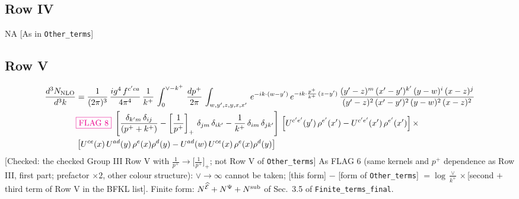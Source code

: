 \documentclass[9pt]{article}
\numberwithin{equation}{section}
\begin{document}
\subsection{Row IV}
\textsc{NA} {\color{red}[As in \texttt{Other\_terms}]}
\subsection{Row V}
\begin{align}
    \frac{d^{3}N_{\rm NLO}}{d^{3}k} & = \frac{1}{(2\pi)^{3}}\, \frac{ig^{4}\,f^{c'ca}}{4\pi^{4}}\, \frac{1}{k^{+}}\,\int_{0}^{\vee-k^{+}}\, \frac{dp^{+}}{2\pi}\, \int_{w,y',z,y,x,x'}\, e^{-ik\cdot (w-y')}\, e^{-ik\cdot \frac{p^{+}}{k^{+}}\,(z-y')}\, \frac{(y'-z)^{m}\,(x'-y')^{k'}\,(y-w)^{i}\,(x-z)^{j}}{(y'-z)^{2}\,(x'-y')^{2}\,(y-w)^{2}\,(x-z)^{2}}\notag \\ & {\color{magenta}\fbox{FLAG 8}}\;\left[\frac{\delta_{k'm}\,\delta_{ij}}{(p^{+}+k^{+})}-\left[\frac{1}{p^{+}}\right]_{+}\,\delta_{jm}\,\delta_{ik'}-\frac{1}{k^{+}}\, \delta_{im}\, \delta_{jk'}\right]\, \left[U^{c'e'}(y')\,\rho^{e'}(x')-U^{c'e'}(x')\,\rho^{e'}(x')\right]\times \notag \\ &  \left[U^{ce}(x)\,U^{ad}(y)\,\rho^{e}(x)\rho^{d}(y)-U^{ad}(w)\,U^{ce}(x)\,\rho^{e}(x)\rho^{d}(y)\right]
\end{align} {\color{red}[Checked: the checked Group III Row V with $\frac{1}{p^{+}}\to\big[\frac{1}{p^{+}}\big]_{+}$; not Row V of \texttt{Other\_terms}]} {\color{magenta} As FLAG 6 (same kernels and $p^{+}$ dependence as Row III, first part; prefactor $\times2$, other colour structure): $\vee\to\infty$ cannot be taken; [this form] $-$ [form of \texttt{Other\_terms}] $=\log\frac{\vee}{k^{+}}\times$[second $+$ third term of Row V in the BFKL list]. Finite form: $N^{\widehat{\mathcal{E}}}+N^{\Psi}+N^{\rm sub}$ of Sec.~3.5 of \texttt{Finite\_terms\_final}.}\par\noindent
\end{document}
